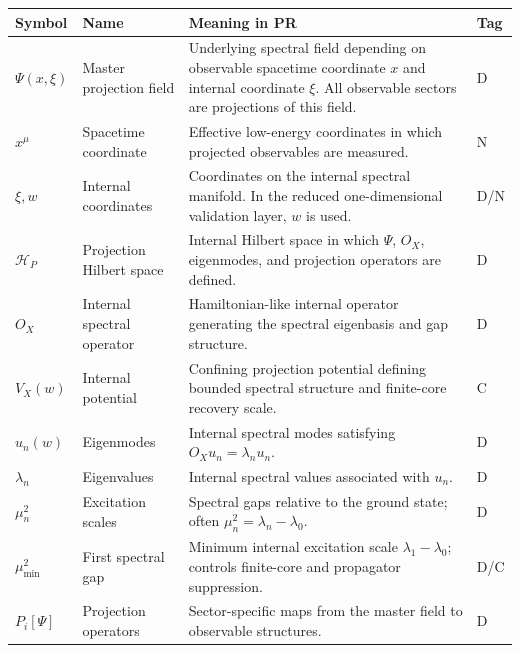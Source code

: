 \documentclass[11pt]{article}
\begin{document}
\begin{longtable}{>{\raggedright\arraybackslash}p{}
>{\raggedright\arraybackslash}p{}
>{\raggedright\arraybackslash}p{}
>{\centering\arraybackslash}p{}}
\toprule
\textbf{Symbol} & \textbf{Name} & \textbf{Meaning in PR} & \textbf{Tag} \\
\midrule
\endhead

$\Psi(x,\xi)$ & Master projection field & Underlying spectral field depending on observable spacetime coordinate $x$ and internal coordinate $\xi$. All observable sectors are projections of this field. & D \\

$x^\mu$ & Spacetime coordinate & Effective low-energy coordinates in which projected observables are measured. & N \\

$\xi,w$ & Internal coordinates & Coordinates on the internal spectral manifold. In the reduced one-dimensional validation layer, $w$ is used. & D/N \\

$\mathcal H_P$ & Projection Hilbert space & Internal Hilbert space in which $\Psi$, $O_X$, eigenmodes, and projection operators are defined. & D \\

$O_X$ & Internal spectral operator & Hamiltonian-like internal operator generating the spectral eigenbasis and gap structure. & D \\

$V_X(w)$ & Internal potential & Confining projection potential defining bounded spectral structure and finite-core recovery scale. & C \\

$u_n(w)$ & Eigenmodes & Internal spectral modes satisfying $O_Xu_n=\lambda_nu_n$. & D \\

$\lambda_n$ & Eigenvalues & Internal spectral values associated with $u_n$. & D \\

$\mu_n^2$ & Excitation scales & Spectral gaps relative to the ground state; often $\mu_n^2=\lambda_n-\lambda_0$. & D \\

$\mu_{\min}^2$ & First spectral gap & Minimum internal excitation scale $\lambda_1-\lambda_0$; controls finite-core and propagator suppression. & D/C \\

$P_i[\Psi]$ & Projection operators & Sector-specific maps from the master field to observable structures. & D \\


\end{longtable}
\end{document}
